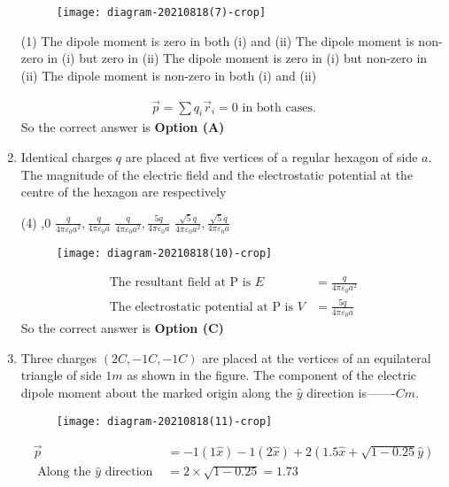\begin{enumerate}
\begin{figure}[H]
\centering
\texttt{[image: diagram-20210818(7)-crop]}
\end{figure}
\begin{tasks}(1)
\task[\textbf{A.}] The dipole moment is zero in both (i) and (ii)
\task[\textbf{B.}] The dipole moment is non-zero in (i) but zero in (ii)
\task[\textbf{C.}] The dipole moment is zero in (i) but non-zero in (ii)
\task[\textbf{D.}] The dipole moment is non-zero in both (i) and (ii)
\end{tasks}
\begin{answer}
\begin{align*}
\vec{p}=\sum q_{i} \vec{r}_{i}=0\text{ in both cases.}
\end{align*}
So the correct answer is \textbf{Option (A)}
\end{answer}
	\item Identical charges $q$ are placed at five vertices of a regular hexagon of side $a$. The magnitude of the electric field and the electrostatic potential at the centre of the hexagon are respectively

\begin{tasks}(4)
,0
\task[\textbf{B.}] $\frac{q}{4 \pi \varepsilon_{0} a^{2}}, \frac{q}{4 \pi \varepsilon_{0} a}$
\task[\textbf{C.}] $\frac{q}{4 \pi \varepsilon_{0} a^{2}}, \frac{5 q}{4 \pi \varepsilon_{0} a}$
\task[\textbf{D.}]  $\frac{\sqrt{5} q}{4 \pi \varepsilon_{0} a^{2}}, \frac{\sqrt{5} q}{4 \pi \varepsilon_{0} a}$
\end{tasks}
\begin{answer}
\begin{figure}[H]
	\centering
	\texttt{[image: diagram-20210818(10)-crop]}
\end{figure}
\begin{align*}
\text{The resultant field at }\mathrm{P}\text{ is }E&=\frac{q}{4 \pi \varepsilon_{0} a^{2}}\\
\text{The electrostatic potential at }\mathrm{P}\text{ is }V&=\frac{5 q}{4 \pi \varepsilon_{0} a}
\end{align*}
So the correct answer is \textbf{Option (C)}
\end{answer}
	\item Three charges $(2 C,-1 C,-1 C)$ are placed at the vertices of an equilateral triangle of side $1 m$ as shown in the figure. The component of the electric dipole moment about the marked origin along the $\hat{y}$ direction is-------$C m$.

\begin{figure}[H]
\centering
\texttt{[image: diagram-20210818(11)-crop]}
\end{figure}
\begin{answer}
\begin{align*}
\vec{p}&=-1(1 \hat{x})-1(2 \hat{x})+2(1.5 \hat{x}+\sqrt{1-0.25} \hat{y})\\
\text{	Along the }\hat{y}\text{ direction }&=2 \times \sqrt{1-0.25}=1.73
\end{align*}
\end{answer}
\end{enumerate}
